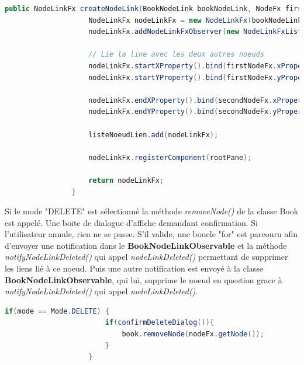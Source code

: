 				\begin{lstlisting}[gobble=12, language=java, caption=nodeLinkAdded()]
				public NodeLinkFx createNodeLink(BookNodeLink bookNodeLink, NodeFx firstNodeFx, NodeFx secondNodeFx) {
					NodeLinkFx nodeLinkFx = new NodeLinkFx(bookNodeLink, firstNodeFx, secondNodeFx, zoom);
					nodeLinkFx.addNodeLinkFxObserver(new NodeLinkFxListener());

					// Lie la line avec les deux autres noeuds
					nodeLinkFx.startXProperty().bind(firstNodeFx.xProperty().add(firstNodeFx.widthProperty().divide(2)));
					nodeLinkFx.startYProperty().bind(firstNodeFx.yProperty().add(firstNodeFx.heightProperty().divide(2)));

					nodeLinkFx.endXProperty().bind(secondNodeFx.xProperty().add(secondNodeFx.widthProperty().divide(2)));
					nodeLinkFx.endYProperty().bind(secondNodeFx.yProperty().add(secondNodeFx.heightProperty().divide(2)));

					listeNoeudLien.add(nodeLinkFx);

					nodeLinkFx.registerComponent(rootPane);

					return nodeLinkFx;
				}
				\end{lstlisting}


				Si le mode "DELETE" est sélectionné la méthode \textit{removeNode()} de la classe Book est appelé. Une boite de dialogue d'affiche demandant confirmation. Si l'utilisateur annule, rien ne se passe. S'il valide, une boucle "for" est parcouru afin d'envoyer une notification dans le \textbf{BookNodeLinkObservable} et la méthode \textit{notifyNodeLinkDeleted()} qui appel \textit{nodeLinkDeleted()} permettant de supprimer les liens lié à ce noeud. Puis une autre notification est envoyé à la classe \textbf{BookNodeLinkObservable}, qui lui, supprime le noeud en question grace à \textit{notifyNodeLinkDeleted()} qui appel \textit{nodeLinkDeleted()}.

				\begin{lstlisting}[gobble=12, language=java, caption=Classe NodeFxListener avec le mode DELETE]
					if(mode == Mode.DELETE) {
						if(confirmDeleteDialog()){
							book.removeNode(nodeFx.getNode());
						}
					}
				\end{lstlisting}

